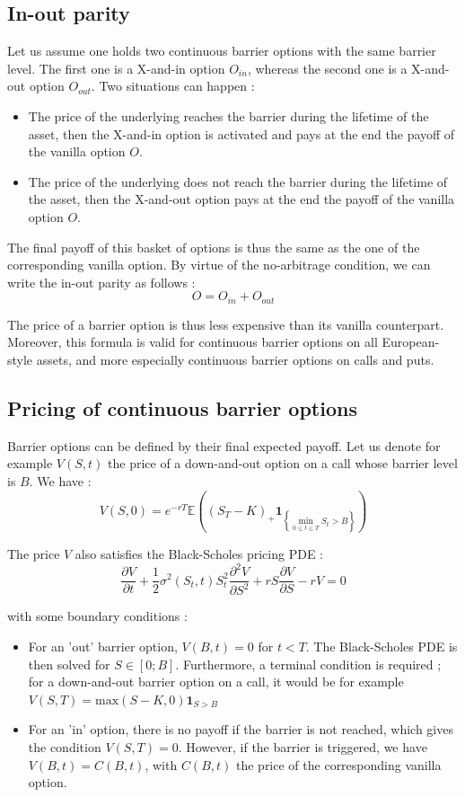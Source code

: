 \documentclass[a4paper,11pt,english]{book}
\begin{document}
\subsection{In-out parity}
Let us assume one holds two continuous barrier options with the same barrier level. The first one is a X-and-in option $O_{in}$, whereas the second one is a X-and-out option $O_{out}$. Two situations can happen : 
\begin{itemize}
    \item The price of the underlying reaches the barrier during the lifetime of the asset, then the X-and-in option is activated and pays at the end the payoff of the vanilla option $O$.
    \item The price of the underlying does not reach the barrier during the lifetime of the asset, then the X-and-out option pays at the end the payoff of the vanilla option $O$.
\end{itemize}

The final payoff of this basket of options is thus the same as the one of the corresponding vanilla option. By virtue of the no-arbitrage condition, we can write the in-out parity as follows : 
$$O = O_{in} + O_{out}$$

The price of a barrier option is thus less expensive than its vanilla counterpart. Moreover, this formula is valid for continuous barrier options on all European-style assets, and more especially continuous barrier options on calls and puts.

\subsection{Pricing of continuous barrier options}
Barrier options can be defined by their final expected payoff. Let us denote for example $V(S,t)$ the price of a down-and-out option on a call whose barrier level is $B$. We have : 
$$V(S,0) = e^{-rT}\mathbb{E}\left((S_T-K)_+\mathbf{1}_{\left\{\underset{0 \leq t \leq T}{\min} S_t>B\right\}}\right)$$

The price $V$ also satisfies the Black-Scholes pricing PDE :
\begin{equation}
    \frac{\partial V}{\partial t} + \frac{1}{2}\sigma^2(S_t,t)S_t^2 \frac{\partial^2 V}{\partial S^2} + rS\frac{\partial V}{\partial S}-rV=0
    \label{eq:BS-PDE}
\end{equation}


with some boundary conditions :
\begin{itemize}
    \item For an 'out' barrier option, $V(B,t)=0$ for $t<T$. The Black-Scholes PDE is then solved for $S\in[0;B]$. Furthermore, a terminal condition is required ; for a down-and-out barrier option on a call, it would be for example $V(S,T)=\text{max}(S-K,0)\mathbf{1}_{S>B}$
    \item For an 'in' option, there is no payoff if the barrier is not reached, which gives the condition $V(S,T)=0$. However, if the barrier is triggered, we have $V(B,t)=C(B,t)$, with $C(B,t)$ the price of the corresponding vanilla option.
\end{itemize}
\end{document}
